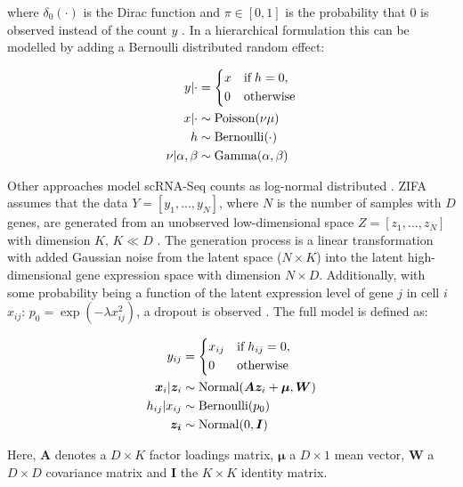 where $\delta_0(\cdot)$ is the Dirac function and $\pi\in[0,1]$ is the probability that 0 is observed instead of the count $y$ \citep{Risso2018}. In a hierarchical formulation this can be modelled by adding a Bernoulli distributed random effect:

\begin{align*}
y|\cdot & = 
 \left\lbrace
  \begin{aligned}
    & x && \textnormal{if} \; h = 0,  \\ 
    & 0 && \textnormal{otherwise}    	    
  \end{aligned}
\right.\\
x|\cdot&\sim{}\textnormal{Poisson}(\nu\mu)\\
h & \sim \textnormal{Bernoulli}(\cdot)\\
\nu|\alpha,\beta&\sim{}\textnormal{Gamma}(\alpha,\beta)
\end{align*}

Other approaches model scRNA-Seq counts as log-normal distributed \citep{Azizi2017,Pierson2015}. \Gls{ZIFA} assumes that the data $Y=[y_1,...,y_N]$, where $N$ is the number of samples with $D$ genes, are generated from an unobserved low-dimensional space $Z=[z_1,...,z_N]$ with dimension $K,\,{}K\ll{}D$ \citep{Pierson2015}. The generation process is a linear transformation with added Gaussian noise from the latent space ($N\times{}K$) into the latent high-dimensional gene expression space with dimension $N\times{}D$. Additionally, with some probability being a function of the latent expression level of gene $j$ in cell $i$ $x_{ij}$: $p_0=\exp(-\lambda{}x_{ij}^2)$, a dropout is observed \citep{Pierson2015}. The full model is defined as:

\begin{align*}
y_{ij} & = 
 \left\lbrace
  \begin{aligned}
    & x_{ij} && \textnormal{if} \; h_{ij} = 0,  \\ 
    & 0 && \textnormal{otherwise}    	    
  \end{aligned}
\right.\\
\bm{x}_{i}|\bm{z}_i&\sim{}\textnormal{Normal}(\bm{Az}_i+\bm{\mu},\bm{W})\\
h_{ij}|x_{ij} & \sim \textnormal{Bernoulli}(p_0)\\
\bm{z_i}&\sim{}\textnormal{Normal}(0,\bm{I})
\end{align*} 

Here, $\bm{A}$ denotes a $D\times{}K$ factor loadings matrix, $\bm{\mu}$ a $D\times{}1$ mean vector, $\bm{W}$ a $D\times{}D$ covariance matrix and $\bm{I}$ the $K\times{}K$ identity matrix.

